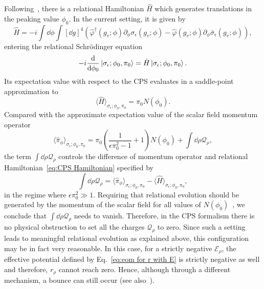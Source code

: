 \documentclass[11pt,a4paper]{article}
\begin{document}
Following~\cite{Marchetti:2020umh}, there is a relational Hamiltonian $\hat{H}$ which generates translations in the peaking value $\phi_0$. In the current setting, it is given by
%
\begin{equation}\label{eq:CPS Hamiltonian}
\hat{H}
=
-i\int\dd{\phi}\int\left[\dd{g}\right]^4\left(\hat{\varphi}^{\dagger}(g_v;\phi)\partial_{\phi}\sigma_{\epsilon}(g_v;\phi)-\hat{\varphi}(g_v;\phi)\partial_{\phi}\bar{\sigma}_{\epsilon}(g_v;\phi)\right),
\end{equation}
%
entering the relational Schr\"odinger equation
%
\begin{equation}
-i\dv{}{\phi_0}\ket{\sigma_{\epsilon};\phi_0,\pi_0}
=
\hat{H}\ket{\sigma_{\epsilon};\phi_0,\pi_0}.
\end{equation}
%
Its expectation value with respect to the CPS evaluates in a saddle-point approximation to~\cite{Marchetti:2020umh}%
\begin{equation}
\langle\hat{H}\rangle_{\sigma_{\epsilon};\phi_0,\pi_0}
=
\pi_0 N(\phi_0).
\end{equation}
%
Compared with the approximate expectation value of the scalar field momentum operator
%
\begin{equation}
\langle\hat{\pi}_{\phi}\rangle_{\sigma_{\epsilon};\phi_0,\pi_0}
=
\pi_0\left(\frac{1}{\epsilon\pi_0^2-1}+1\right)N(\phi_0)+\int\dd{\rho}\mathcal{Q}_{\rho},
\end{equation}
%
the term $\int\dd{\rho}\mathcal{Q}_{\rho}$ controls the difference of momentum operator and relational Hamiltonian~\eqref{eq:CPS Hamiltonian} specified by 
%
\begin{equation}
\int\dd{\rho}\mathcal{Q}_{\rho}
=
\langle\hat{\pi}_{\phi}\rangle_{\sigma_{\epsilon};\phi_0,\pi_0}-\langle\hat{H}\rangle_{\sigma_{\epsilon};\phi_0,\pi_0},
\end{equation}
%
in the regime where $\epsilon\pi_0^2\gg 1$. Requiring that relational evolution should be generated by the momentum of the scalar field for all values of $N(\phi_0)$~\cite{Marchetti:2020umh},  we conclude that $\int\dd{\rho}\mathcal{Q}_{\rho}$  needs to vanish. Therefore, in the CPS formalism there is no physical obstruction to set all the charges $\mathcal{Q}_{\rho}$ to zero. Since such a setting leads to meaningful relational evolution as explained above, this configuration may be in fact very reasonable. In this case, for a strictly negative $\mathcal{E}_{\rho}$, the effective potential defined by Eq.~\eqref{eq:eom for r with E} is strictly negative as well and therefore, $r_{\rho}$ cannot reach zero. Hence, although through a different mechanism, a bounce can still occur (see also~\cite{deCesare:2016rsf,Pithis:2016cxg}). 
\end{document}
